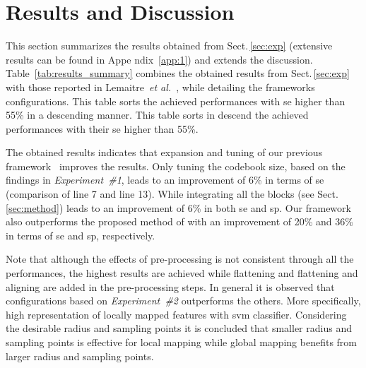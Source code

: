 
\section{Results and Discussion}
\label{sec:res-dis}
This section summarizes the results obtained from Sect.\,\ref{sec:exp} (extensive results can be found in Appe	ndix~\ref{app:1}) and extends the discussion.
Table~\ref{tab:results_summary} combines the obtained results from Sect.\,\ref{sec:exp} with those reported in Lemaitre~\emph{et al.}~\cite{Lemaintre2015miccaiOCT}, while detailing the frameworks configurations.
{\color{red}This table sorts the achieved performances with \ac{se} higher than 55\% in a descending manner.}
This table sorts in descend the achieved performances with their \ac{se} higher than 55\%.

The obtained results indicates that expansion and tuning of our previous framework~\cite{Lemaintre2015miccaiOCT} improves the results.
Only tuning the codebook size, based on the findings in \emph{Experiment~\#1}, leads to an improvement of 6\% in terms of \ac{se} (comparison of line 7 and line 13).
While integrating all the blocks (see Sect.\,\ref{sec:method}) leads to an improvement of 6\% in both \ac{se} and \ac{sp}.
Our framework also outperforms the proposed method of \cite{Venhuizen2015} with an improvement of 20\% and 36\% in terms of \ac{se} and \ac{sp}, respectively.

Note that although the effects of pre-processing is not consistent through all the performances, the highest results are achieved while flattening and flattening and aligning are added in the pre-processing steps.
In general it is observed that configurations based on \emph{Experiment~\#2} outperforms the others.
More specifically, high representation of locally mapped features with \ac{svm} classifier.
Considering the desirable radius and sampling points it is concluded that smaller radius and sampling points is effective for local mapping while global mapping benefits from larger radius and sampling points. 



